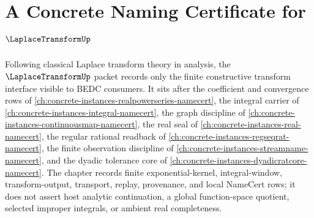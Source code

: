 \chapter{A Concrete Naming Certificate for $\LaplaceTransformUp$}
\label{ch:concrete-instances-laplace-transform-namecert}

Following classical Laplace transform theory in analysis, the $\LaplaceTransformUp$ packet records only the finite constructive transform interface visible to BEDC consumers. It sits after the coefficient and convergence rows of \autoref{ch:concrete-instances-realpowerseries-namecert}, the integral carrier of \autoref{ch:concrete-instances-integral-namecert}, the graph discipline of \autoref{ch:concrete-instances-continuousmap-namecert}, the real seal of \autoref{ch:concrete-instances-real-namecert}, the regular rational readback of \autoref{ch:concrete-instances-regseqrat-namecert}, the finite observation discipline of \autoref{ch:concrete-instances-streamname-namecert}, and the dyadic tolerance core of \autoref{ch:concrete-instances-dyadicratcore-namecert}. The chapter records finite exponential-kernel, integral-window, transform-output, transport, replay, provenance, and local NameCert rows; it does not assert host analytic continuation, a global function-space quotient, selected improper integrals, or ambient real completeness.

